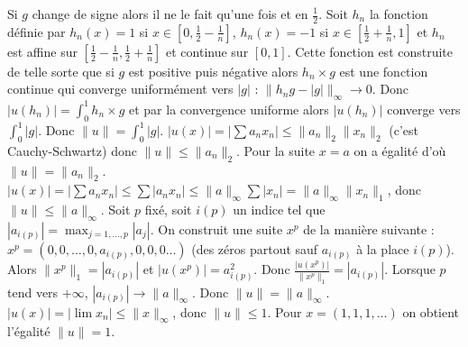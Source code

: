 {{Si $g$ change de signe alors il ne le fait qu'une fois et en $\frac 12$.
Soit $h_n$ la fonction définie par $h_n(x) = 1$ si $x\in[0,\frac 12 -\frac 1n]$,
$h_n(x) = -1$ si $x\in[\frac 12 +\frac 1n,1]$ et $h_n$ est affine sur $[\frac 12 -\frac 1n,\frac 12 +\frac 1n]$  et continue 
sur $[0,1]$. Cette fonction est construite de telle sorte que si $g$ est positive puis négative alors $h_n\times g$ est une fonction continue qui converge uniformément vers $|g|$ : $\| h_n g - |g| \|_\infty \rightarrow 0$.
Donc $| u(h_n) | = \int_0^1 h_n\times g$ 
et par la convergence uniforme alors $| u(h_n) |$ converge vers
$\int_0^1|g|$. Donc $\|u\| = \int_0^1|g|$.
$|u(x)| = |\sum a_nx_n| \le \|a_n \|_2\| x_n\|_2$ (c'est Cauchy-Schwartz)
donc $\| u \| \le \|a_n \|_2$. Pour la suite $x=a$ on a égalité d'o\`u
$\| u\| = \|a_n \|_2$.
$|u(x)| = |\sum a_nx_n| \le \sum |a_nx_n| \le \|a \|_\infty \sum |x_n| = \|a \|_\infty \| x_n\|_1$, donc $\| u \| \le \|a \|_\infty$. 
Soit $p$ fixé, soit $i(p)$ un indice tel que $|a_{i(p)}| = \max_{j=1,\ldots,p} |a_j|$.
On construit une suite $x^p$ de la manière suivante : 
$x^p = (0,0,\ldots,0,a_{i(p)},0,0,0\ldots)$ (des zéros partout sauf $a_{i(p)}$ à la place $i(p)$). Alors $\| x^p \|_1 = |a_{i(p)}|$ et $|u(x^p)| = a_{i(p)}^2$.
Donc $\frac{|u(x^p)|}{\| x^p \|_1} = | a_{i(p)}|$.
Lorsque $p$ tend vers $+\infty$, $| a_{i(p)}| \rightarrow \|a \|_\infty$.
Donc $\| u \| = \|a \|_\infty$.
$|u(x)| = |\lim x_n| \le \| x \|_\infty$, donc $\| u \| \le 1$.
Pour $x=(1,1,1,\ldots)$ on obtient l'égalité $\| u \| = 1$.
}
}
